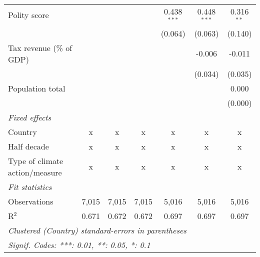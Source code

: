 \begin{tabular}{lcccccc}
   Polity score                                                       &         &                &                & 0.438$^{***}$  & 0.448$^{***}$  & 0.316$^{**}$\\   
                                                                      &         &                &                & (0.064)        & (0.063)        & (0.140)\\   
   Tax revenue (\% of GDP)                                            &         &                &                &                & -0.006         & -0.011\\   
                                                                      &         &                &                &                & (0.034)        & (0.035)\\   
   Population total                                                   &         &                &                &                &                & 0.000\\   
                                                                      &         &                &                &                &                & (0.000)\\   
   \emph{Fixed effects}\\
   Country                                                            & x       & x              & x              & x              & x              & x\\  
   Half decade                                                        & x       & x              & x              & x              & x              & x\\  
   Type of climate action/measure                                     & x       & x              & x              & x              & x              & x\\  
   \midrule \emph{Fit statistics}\\
   Observations                                                       & 7,015   & 7,015          & 7,015          & 5,016          & 5,016          & 5,016\\  
   R$^2$                                                              & 0.671   & 0.672          & 0.672          & 0.697          & 0.697          & 0.697\\  
   \midrule
   \multicolumn{7}{l}{\emph{Clustered (Country) standard-errors in parentheses}}\\
   \multicolumn{7}{l}{\emph{Signif. Codes: ***: 0.01, **: 0.05, *: 0.1}}\\
\end{tabular}
\par\endgroup


